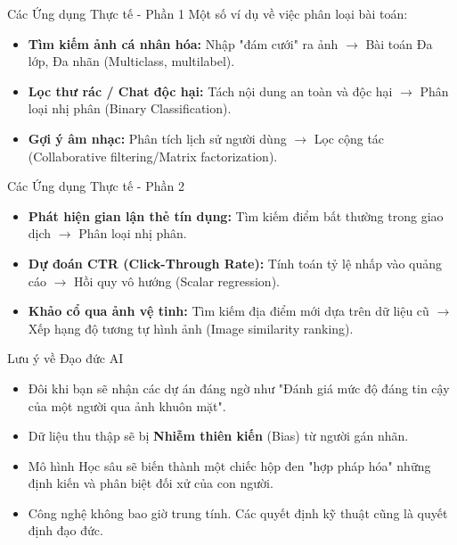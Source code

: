 \documentclass[aspectratio=169]{beamer}
\begin{document}
\begin{frame}{Các Ứng dụng Thực tế - Phần 1}
    Một số ví dụ về việc phân loại bài toán:
    \begin{itemize}
        \item \textbf{Tìm kiếm ảnh cá nhân hóa:} Nhập "đám cưới" ra ảnh $\rightarrow$ Bài toán Đa lớp, Đa nhãn (Multiclass, multilabel).
        \item \textbf{Lọc thư rác / Chat độc hại:} Tách nội dung an toàn và độc hại $\rightarrow$ Phân loại nhị phân (Binary Classification).
        \item \textbf{Gợi ý âm nhạc:} Phân tích lịch sử người dùng $\rightarrow$ Lọc cộng tác (Collaborative filtering/Matrix factorization).
    \end{itemize}
\end{frame}

\begin{frame}{Các Ứng dụng Thực tế - Phần 2}
    \begin{itemize}
        \item \textbf{Phát hiện gian lận thẻ tín dụng:} Tìm kiếm điểm bất thường trong giao dịch $\rightarrow$ Phân loại nhị phân.
        \item \textbf{Dự đoán CTR (Click-Through Rate):} Tính toán tỷ lệ nhấp vào quảng cáo $\rightarrow$ Hồi quy vô hướng (Scalar regression).
        \item \textbf{Khảo cổ qua ảnh vệ tinh:} Tìm kiếm địa điểm mới dựa trên dữ liệu cũ $\rightarrow$ Xếp hạng độ tương tự hình ảnh (Image similarity ranking).
    \end{itemize}
\end{frame}

\begin{frame}{Lưu ý về Đạo đức AI}
    \begin{itemize}
        \item Đôi khi bạn sẽ nhận các dự án đáng ngờ như "Đánh giá mức độ đáng tin cậy của một người qua ảnh khuôn mặt".
        \item Dữ liệu thu thập sẽ bị \textbf{Nhiễm thiên kiến} (Bias) từ người gán nhãn.
        \item Mô hình Học sâu sẽ biến thành một chiếc hộp đen "hợp pháp hóa" những định kiến và phân biệt đối xử của con người.
        \item Công nghệ không bao giờ trung tính. Các quyết định kỹ thuật cũng là quyết định đạo đức.
    \end{itemize}
\end{frame}
\end{document}
